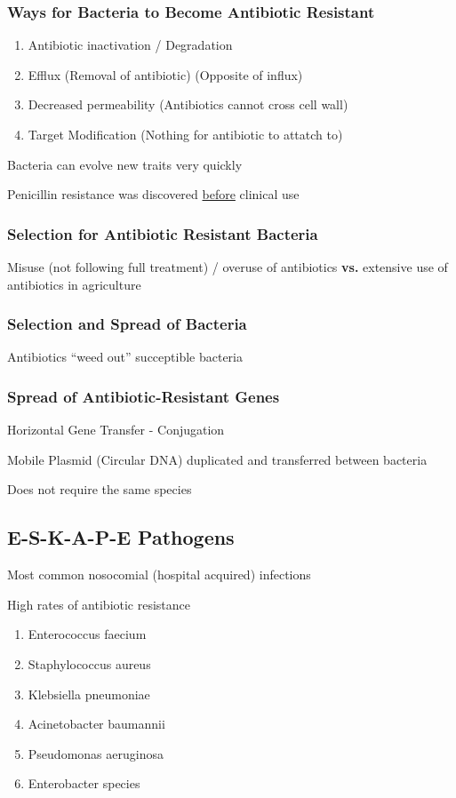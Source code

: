 \documentclass{notes}
\begin{document}
\subsubsection*{Ways for Bacteria to Become Antibiotic Resistant}
\begin{enumerate}
    \item Antibiotic inactivation / Degradation
    \item Efflux (Removal of antibiotic) (Opposite of influx)
    \item Decreased permeability (Antibiotics cannot cross cell wall)
    \item Target Modification (Nothing for antibiotic to attatch to)
\end{enumerate}

Bacteria can evolve new traits very quickly

\tab \indicates Penicillin resistance was discovered \underline{before} clinical use

\subsubsection*{Selection for Antibiotic Resistant Bacteria}
Misuse (not following full treatment) / overuse of antibiotics \textbf{vs.} extensive use of antibiotics in agriculture

\subsubsection*{Selection and Spread of Bacteria}
Antibiotics ``weed out'' succeptible bacteria

\subsubsection*{Spread of Antibiotic-Resistant Genes}
Horizontal Gene Transfer - Conjugation

\tab \indicates Mobile Plasmid (Circular DNA) duplicated and transferred between bacteria

Does not require the same species

\subsection*{E-S-K-A-P-E Pathogens}

Most common nosocomial (hospital acquired) infections

High rates of antibiotic resistance

\begin{enumerate}
    \item Enterococcus faecium
    \item Staphylococcus aureus
    \item Klebsiella pneumoniae
    \item Acinetobacter baumannii
    \item Pseudomonas aeruginosa
    \item Enterobacter species
\end{enumerate}
\end{document}
